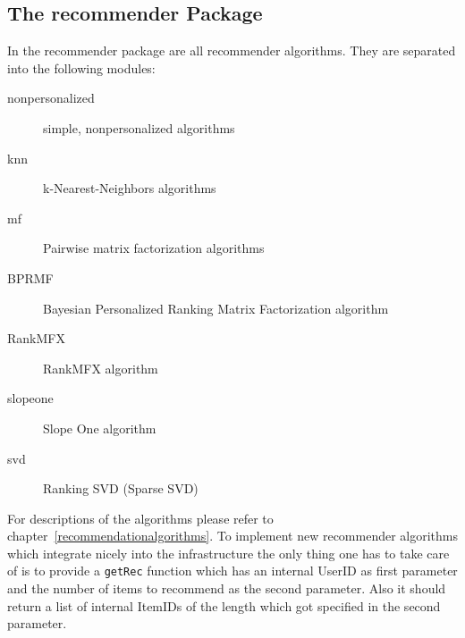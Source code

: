 \subsection*{The recommender Package}
In the recommender package are all recommender algorithms.
They are separated into the following modules:
\begin{description}
\item[nonpersonalized] simple, nonpersonalized algorithms
\item[knn] k-Nearest-Neighbors algorithms
\item[mf] Pairwise matrix factorization algorithms
\item[BPRMF] Bayesian Personalized Ranking Matrix Factorization algorithm
\item[RankMFX] RankMFX algorithm
\item[slopeone] Slope One algorithm
\item[svd] Ranking SVD (Sparse SVD)
\end{description}
For descriptions of the algorithms please refer to chapter~\ref{recommendationalgorithms}.
To implement new recommender algorithms which integrate nicely into the infrastructure
the only thing one has
to take care of is to provide a \lstinline!getRec! function which has an 
internal UserID as first parameter and the number of items to recommend
as the second parameter. Also it should return a list of internal ItemIDs of the
length which got specified in the second parameter.
